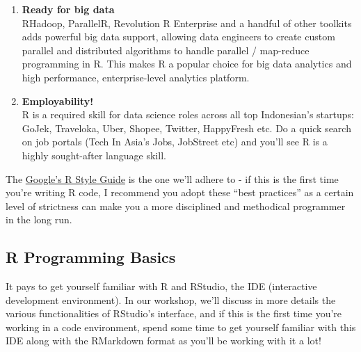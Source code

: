 \documentclass[]{article}
\begin{document}
\begin{enumerate}
  \href{https://code.google.com/archive/p/google-prediction-api-r-client/}{its
  own R client for the Google Prediction API},
  \href{http://web.stanford.edu/class/cs109l/unrestricted/resources/google-style.html}{Google's
  R style guide}, and its developers have released a number of R
  packages over the years. Microsoft first uses R for Azure capacity
  planning, Xbox's TrueSkill Matchmaking System, player churn analysis,
  in-game purchase optimization, fraud detection, and other internal
  services across Microsoft's line of products\footnote{\href{http://blog.revolutionanalytics.com/2015/06/r-at-microsoft.html}{R
    at Microsoft}}, and then went on to acquire Revolution Analytics,
  whom products were then rebranded and renewed by Microsoft and now
  known as Microsoft R Server, Microsoft R Open, Microsoft Data Science
  Virtual Machine etc.
\item
  \textbf{Ready for big data}\\
  RHadoop, ParallelR, Revolution R Enterprise and a handful of other
  toolkits adds powerful big data support, allowing data engineers to
  create custom parallel and distributed algorithms to handle parallel /
  map-reduce programming in R. This makes R a popular choice for big
  data analytics and high performance, enterprise-level analytics
  platform.
\item
  \textbf{Employability!}\\
  R is a required skill for data science roles across all top
  Indonesian's startups: GoJek, Traveloka, Uber, Shopee, Twitter,
  HappyFresh etc. Do a quick search on job portals (Tech In Asia's Jobs,
  JobStreet etc) and you'll see R is a highly sought-after language
  skill.
\end{enumerate}

The \href{Google's\%20R\%20Style\%20Guide}{Google's R Style Guide} is
the one we'll adhere to - if this is the first time you're writing R
code, I recommend you adopt these ``best practices'' as a certain level
of strictness can make you a more disciplined and methodical programmer
in the long run.

\hypertarget{r-programming-basics}{%
\subsection{R Programming Basics}\label{r-programming-basics}}

It pays to get yourself familiar with R and RStudio, the IDE
(interactive development environment). In our workshop, we'll discuss in
more details the various functionalities of RStudio's interface, and if
this is the first time you're working in a code environment, spend some
time to get yourself familiar with this IDE along with the RMarkdown
format as you'll be working with it a lot!
\end{document}
